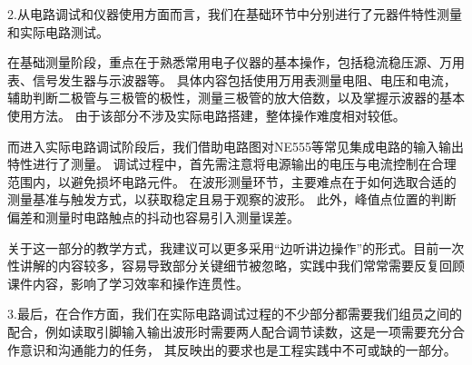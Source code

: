 \documentclass[12pt,a4paper]{article}
\begin{document}
2.从电路调试和仪器使用方面而言，我们在基础环节中分别进行了元器件特性测量和实际电路测试。

在基础测量阶段，重点在于熟悉常用电子仪器的基本操作，包括稳流稳压源、万用表、信号发生器与示波器等。
具体内容包括使用万用表测量电阻、电压和电流，辅助判断二极管与三极管的极性，测量三极管的放大倍数，以及掌握示波器的基本使用方法。
由于该部分不涉及实际电路搭建，整体操作难度相对较低。

而进入实际电路调试阶段后，我们借助电路图对NE555等常见集成电路的输入输出特性进行了测量。
调试过程中，首先需注意将电源输出的电压与电流控制在合理范围内，以避免损坏电路元件。
在波形测量环节，主要难点在于如何选取合适的测量基准与触发方式，以获取稳定且易于观察的波形。
此外，峰值点位置的判断偏差和测量时电路触点的抖动也容易引入测量误差。

关于这一部分的教学方式，我建议可以更多采用“边听讲边操作”的形式。目前一次性讲解的内容较多，容易导致部分关键细节被忽略，实践中我们常常需要反复回顾课件内容，影响了学习效率和操作连贯性。

3.最后，在合作方面，我们在实际电路调试过程的不少部分都需要我们组员之间的配合，例如读取引脚输入输出波形时需要两人配合调节读数，这是一项需要充分合作意识和沟通能力的任务，
其反映出的要求也是工程实践中不可或缺的一部分。
\end{document}
